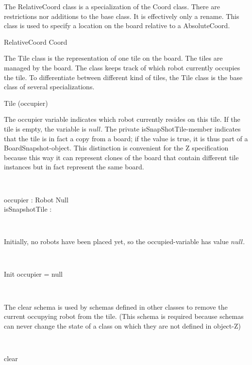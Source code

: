 \documentclass[12pt]{article}
\begin{document}
The RelativeCoord class is a specialization of the Coord class. There are restrictions nor additions to the base class. It is effectively only a rename. This class is used to specify a location on the board relative to a AbsoluteCoord.
\begin{class}{RelativeCoord}
Coord \\
\end{class}

The Tile class is the representation of one tile on the board. The tiles are managed by the board. The class keeps track of which robot currently occupies the tile. To differentiate between different kind of tiles, the Tile class is the base class of several specializations.

\begin{class}{Tile}
\upharpoonright (occupier) \\
\begin{zpar}
The occupier variable indicates which robot currently resides on this tile. If the tile is empty, the variable is $null$. The private isSnapShotTile-member indicates that the tile is in fact a copy from a board; if the value is true, it is thus part of a BoardSnapshot-object. This distinction is convenient for the Z specification because this way it can represent clones of the board that contain different tile instances but in fact represent the same board.
\end{zpar} \\
\begin{state}
occupier : Robot \cup Null \\
isSnapshotTile : \bool \\
\end{state} \\
\begin{zpar}
Initially, no robots have been placed yet, so the occupied-variable has value $null$.
\end{zpar} \\
\begin{schema}{Init}
occupier = null
\end{schema} \\
\begin{zpar}
The clear schema is used by schemas defined in other classes to remove the current occupying robot from the tile. (This schema is required because schemas can never change the state of a class on which they are not defined in object-Z)
\end{zpar} \\
\begin{schema}{clear}

\end{schema}
\end{class}
\end{document}
